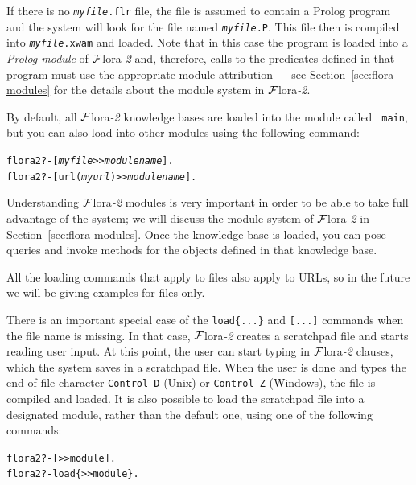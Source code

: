 \documentclass[11pt]{article}
\newcommand{\FLORA}{{\mbox{\sc ${\cal F}${lora}\rm\emph{-2}}}\xspace}
\newcommand{\FLSYSTEM}{\FLORA}
\newcommand{\prompt}{flora2 ?- }
\newcommand{\flrext}{flr\xspace}
\newcommand{\ofile}{xwam}
\begin{document}
If there is no \texttt{\textit{myfile}.\flrext} file, the file is assumed to contain
a Prolog program and the system will look for the file named
\texttt{\textit{myfile}.P}. This file then is compiled into
\texttt{\textit{myfile}.\ofile} and
loaded. Note that in this case the program is loaded into a {\em Prolog
  module} of \FLSYSTEM and, therefore, calls to the predicates defined in that
program must use the appropriate module attribution --- see
Section~\ref{sec:flora-modules} for the details about the module system in
\FLSYSTEM.

\ifdef{\isfloraman}{}
{
    
}


By default, all \FLSYSTEM knowledge bases are loaded into the module called {\tt
  main}, but you can also load into other modules using the following
command:
\begin{alltt}
  \prompt  [\textit{myfile}>{}>\textit{modulename}].
  \prompt  [url(\textit{myurl})>{}>\textit{modulename}].
\end{alltt}
Understanding \FLSYSTEM modules is very important in order to be able to take
full advantage of the system; we will discuss the module system of \FLSYSTEM
in Section~\ref{sec:flora-modules}.  Once the knowledge base is loaded, you can
pose queries and invoke methods for the objects defined in that knowledge
base.

All the loading commands that apply to files also apply to URLs, so in the
future we will be giving examples for files only.

There is an important special case of the {\tt load\{...\}} and {\tt [...]}
commands when the file name is missing. In that case,
\FLSYSTEM creates a scratchpad file and starts reading user
input. At this point, the user can start typing in \FLSYSTEM clauses, which
the system saves in a scratchpad file. When the user is done and types the
end of file character {\tt Control-D} (Unix) or {\tt Control-Z} (Windows),
the file is compiled and loaded. It is also possible to load the scratchpad
file into a designated module, rather than the default one, using one of the
following commands:
\begin{alltt}
  \prompt [>{}>module].
  \prompt load\{>{}>module\}.
\end{alltt}
\end{document}
